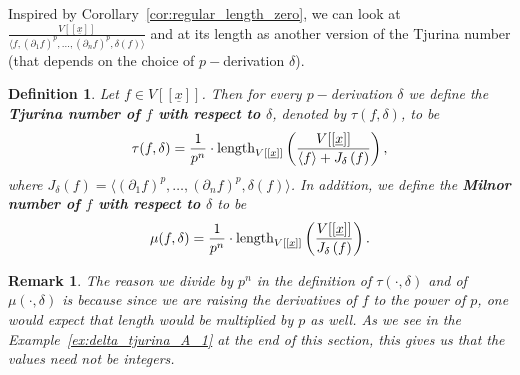 \documentclass{article}
\newtheorem{definition}[theorem]{Definition}
\newtheorem{remark}[theorem]{Remark}
\newcommand{\Vx}{V[[\underline{x}]]}
\numberwithin{theorem}{section}
\begin{document}
Inspired by Corollary~\ref{cor:regular_length_zero}, we can look at $\frac{\Vx}{\langle f,  \left(\partial_1 f\right)^p, \dots, \left(\partial_n f\right)^p, \delta\left(f\right) \rangle}$ and at its length as another version of the Tjurina number (that depends on the choice of $p-$derivation $\delta$). 

\begin{definition}\label{def:tjurina_delta}
    Let $f \in \Vx$. Then for every $p-$derivation $\delta$ we define the \textbf{Tjurina number of $f$ with respect to $\delta$}, denoted by $\tau (f, \delta)$, to be
    \begin{equation*}
        \tau(f, \delta) = \frac{1}{p^n} \cdot \textup{length}_{\Vx}\left(\frac{\Vx}{\langle f \rangle + J_\delta\left(f\right)}\right),
    \end{equation*}
     where $J_\delta\left(f\right) =\langle   \left(\partial_1 f\right)^p, \dots, \left(\partial_n f\right)^p, \delta\left(f\right) \rangle$. In addition, we define the \textbf{Milnor number of $f$ with respect to $\delta$} to be
    \begin{equation*}
        \mu(f, \delta) = \frac{1}{p^n} \cdot \textup{length}_{\Vx}\left(\frac{\Vx}{J_\delta\left(f\right)}\right).
    \end{equation*} 
\end{definition}


\begin{remark}\label{rem:77}
    \textup{The reason we divide by $p^n$ in the definition of $\tau(\cdot,\delta)$ and of $\mu(\cdot, \delta)$ is because since we are raising the derivatives of $f$ to the power of $p$, one would expect that length would be multiplied by $p$ as well. As we see in the Example~\ref{ex:delta_tjurina_A_1} at the end of this section, this gives us that the values need not be integers.}
\end{remark} 
\end{document}

